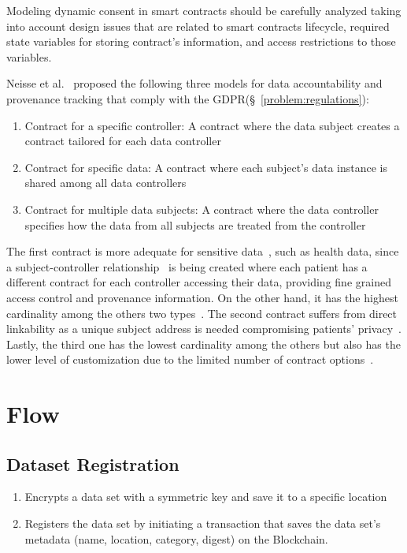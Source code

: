 Modeling dynamic consent in smart contracts should be carefully analyzed taking into account design issues that are related to smart contracts lifecycle, required state variables for storing contract’s information, and access restrictions to those variables.

Neisse et al.~\cite{DBLP:journals/corr/NeisseSF17} proposed the following three models for data accountability and provenance tracking that comply with the GDPR(§~\ref{problem:regulations}):

\begin{enumerate}
  \item Contract for a specific controller: A contract where the data subject creates a contract tailored for each data controller
  \item Contract for specific data: A contract where each subject’s data instance is shared among all data controllers
  \item Contract for multiple data subjects: A contract where the data controller specifies how the data from all subjects are treated from the controller
\end{enumerate}

The first contract is more adequate for sensitive data~\cite{DBLP:journals/corr/NeisseSF17}, such as health data, since a subject-controller relationship~\cite{Azaria2016} is being created where each patient has a different contract for each controller accessing their data, providing fine grained access control and provenance information. On the other hand, it has the highest cardinality among the others two types~\cite{DBLP:journals/corr/NeisseSF17}. The second contract suffers from direct linkability as a unique subject address is needed compromising patients’ privacy~\cite{DBLP:journals/corr/NeisseSF17}. Lastly, the third one has the lowest cardinality among the others but also has the lower level of customization due to the limited number of contract options~\cite{DBLP:journals/corr/NeisseSF17}.

\section{Flow}
\label{solution:flow}

\subsection{Dataset Registration}
\label{solution:flow:reg_data}

\begin{enumerate}
  \item Encrypts a data set with a symmetric key and save it to a specific location
  \item Registers the data set by initiating a transaction that saves the data set's metadata (name, location, category, digest) on the Blockchain.
\end{enumerate}

